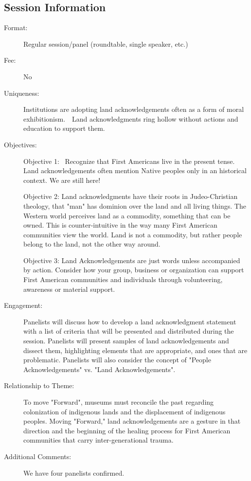 \documentclass{report}
\begin{document}
              \subsection*{Session Information}
                \begin{description}
                  \item [Format:] Regular session/panel (roundtable, single speaker, etc.)
							    
								  \item [Fee:]No
							     
							    \item [Uniqueness:]Institutions are adopting land acknowledgements often as a form of moral exhibitionism.  Land acknowledgments ring hollow without actions and education to support them.
							    \item [Objectives:]Objective 1:  Recognize that First Americans live in the present tense. Land acknowledgements often mention Native peoples only in an historical context. We are still here!  

Objective 2:  Land acknowledgments have their roots in Judeo-Christian theology, that "man" has dominion over the land and all living things.  The Western world perceives land as a commodity, something that can be owned.  This is counter-intuitive in the way many First American communities view the world.  Land is not a commodity, but rather people belong to the land, not the other way around.

Objective 3:  Land Acknowledgements are just words unless accompanied by action. Consider how your group, business or organization can support First American communities and individuals through volunteering, awareness or material support.
							    \item [Engagement:]Panelists will discuss how to develop a land acknowledgment statement with a list of criteria that will be presented and distributed during the session.  Panelists will present samples of land acknowledgements and dissect them, highlighting elements that are appropriate, and ones that are problematic. Panelists will also consider the concept of "People Acknowledgements" vs. "Land Acknowledgements".
							    \item [Relationship to Theme:]To move "Forward", museums must reconcile the past regarding colonization of indigenous lands and the displacement of indigenous peoples.  Moving "Forward," land acknowledgements are a gesture in that direction and the beginning of the healing process for First American communities that carry inter-generational trauma.
							    
                    \item [Additional Comments: ]We have four panelists confirmed.

                \end{description}
\end{document}
